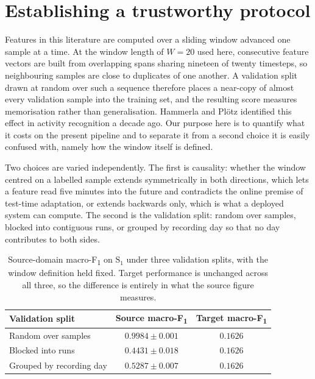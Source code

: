 \documentclass[a4paper,fleqn]{cas-dc}
\newcommand{\macf}{macro-F\textsubscript{1}}
\begin{document}

\section{Establishing a trustworthy protocol}
\label{sec:protocol}

Features in this literature are computed over a sliding window advanced one sample at a
time. At the window length of $W=20$ used here, consecutive feature vectors are built from
overlapping spans sharing nineteen of twenty timesteps, so neighbouring samples are close
to duplicates of one another. A validation split drawn at random over such a sequence
therefore places a near-copy of almost every validation sample into the training set, and
the resulting score measures memorisation rather than generalisation. Hammerla and
Pl\"otz \cite{hammerla2015} identified this effect in activity recognition a decade ago.
Our purpose here is to quantify what it costs on the present pipeline and to separate it
from a second choice it is easily confused with, namely how the window itself is defined.

Two choices are varied independently. The first is causality: whether the window centred on
a labelled sample extends symmetrically in both directions, which lets a feature read five
minutes into the future and contradicts the online premise of test-time adaptation, or
extends backwards only, which is what a deployed system can compute. The second is the
validation split: random over samples, blocked into contiguous runs, or grouped by
recording day so that no day contributes to both sides.

\begin{table}[t]
\centering
\caption{Source-domain \macf{} on $\text{S}_1$ under three validation splits, with the
window definition held fixed. Target performance is unchanged across all three, so the
difference is entirely in what the source figure measures.}
\label{tab:protocol}
\small
\begin{tabular}{@{}lcc@{}}
\toprule
Validation split & Source \macf & Target \macf \\
\midrule
Random over samples & $0.9984\pm0.001$ & $0.1626$ \\
Blocked into runs   & $0.4431\pm0.018$ & $0.1626$ \\
Grouped by recording day & $\mathbf{0.5287}\pm0.007$ & $0.1626$ \\
\bottomrule
\end{tabular}
\end{table}
\end{document}
